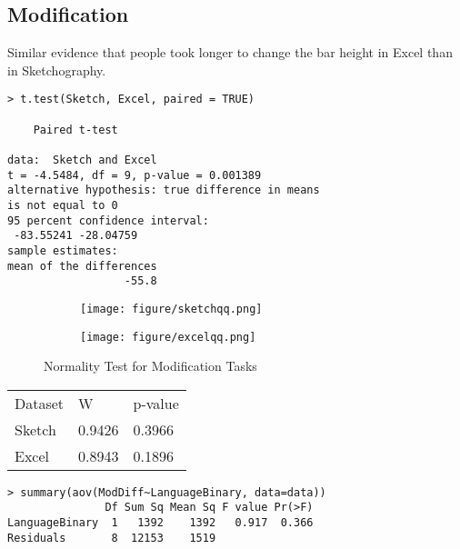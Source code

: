\subsection{Modification}
Similar evidence that people took longer to change the bar height in Excel than in Sketchography.

\begin{verbatim}
> t.test(Sketch, Excel, paired = TRUE)

	Paired t-test

data:  Sketch and Excel
t = -4.5484, df = 9, p-value = 0.001389
alternative hypothesis: true difference in means 
is not equal to 0
95 percent confidence interval:
 -83.55241 -28.04759
sample estimates:
mean of the differences 
                  -55.8 
\end{verbatim}

\begin{figure}[H]
		\centering
		\begin{subfigure}[b]{\textwidth}
			\texttt{[image: figure/sketchqq.png]}
		\end{subfigure}
		\begin{subfigure}[b]{\textwidth}
			\texttt{[image: figure/excelqq.png]}
		\end{subfigure}
		\caption{Normality Test for Modification Tasks}
	\end{figure}


\begin{tabular}{l l l}
Dataset & W & p-value \\
Sketch & 0.9426 & 0.3966 \\
Excel & 0.8943 & 0.1896 \\
\end{tabular}


\begin{verbatim}
> summary(aov(ModDiff~LanguageBinary, data=data))
               Df Sum Sq Mean Sq F value Pr(>F)
LanguageBinary  1   1392    1392   0.917  0.366
Residuals       8  12153    1519    
\end{verbatim}
